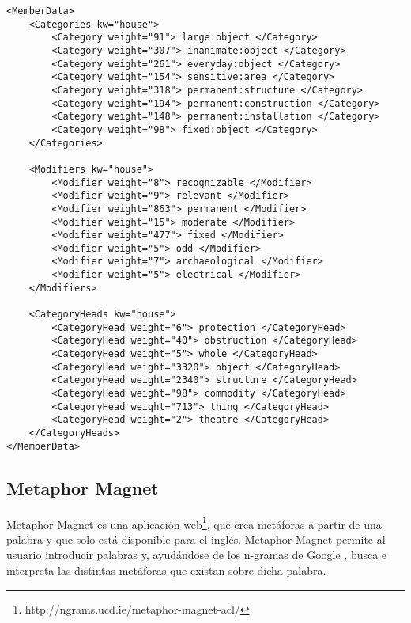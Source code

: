 \lstset{language=XML}
\begin{lstlisting}[caption=XML devuelto por Thesaurus Rex para la palabra \textit{house}, label={lst:xmlthesaurusrex}, frame=single]
<MemberData>
	<Categories kw="house">
		<Category weight="91"> large:object </Category>
		<Category weight="307"> inanimate:object </Category>
		<Category weight="261"> everyday:object </Category>
		<Category weight="154"> sensitive:area </Category>
		<Category weight="318"> permanent:structure </Category>
		<Category weight="194"> permanent:construction </Category>
		<Category weight="148"> permanent:installation </Category>
		<Category weight="98"> fixed:object </Category>
	</Categories>
	
	<Modifiers kw="house">
		<Modifier weight="8"> recognizable </Modifier>
		<Modifier weight="9"> relevant </Modifier>
		<Modifier weight="863"> permanent </Modifier>
		<Modifier weight="15"> moderate </Modifier>
		<Modifier weight="477"> fixed </Modifier>
		<Modifier weight="5"> odd </Modifier>
		<Modifier weight="7"> archaeological </Modifier>
		<Modifier weight="5"> electrical </Modifier>
	</Modifiers>
	
	<CategoryHeads kw="house">
		<CategoryHead weight="6"> protection </CategoryHead>
		<CategoryHead weight="40"> obstruction </CategoryHead>
		<CategoryHead weight="5"> whole </CategoryHead>
		<CategoryHead weight="3320"> object </CategoryHead>
		<CategoryHead weight="2340"> structure </CategoryHead>
		<CategoryHead weight="98"> commodity </CategoryHead>
		<CategoryHead weight="713"> thing </CategoryHead>
		<CategoryHead weight="2"> theatre </CategoryHead>
	</CategoryHeads>
</MemberData>

\end{lstlisting}



\subsection{Metaphor Magnet}
\label{cap:subsec:metaphormagnet}
Metaphor Magnet es una aplicación web\footnote{http://ngrams.ucd.ie/metaphor-magnet-acl/}, que crea metáforas a partir de una palabra y que solo está disponible para el inglés.
Metaphor Magnet permite al usuario introducir palabras y, ayudándose de los n-gramas de Google \citep{VealeT2012}, busca e interpreta las distintas metáforas que existan sobre dicha palabra.

